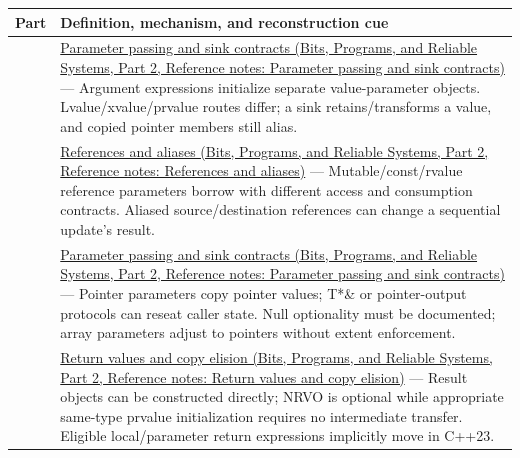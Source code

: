 {\def\LTcaptype{none} %
\begin{longtable}[]{@{}
  >{\raggedright\arraybackslash}p{}
  >{\raggedright\arraybackslash}p{}@{}}
\toprule\noalign{}
\begin{minipage}[b]{\linewidth}\raggedright
Part
\end{minipage} & \begin{minipage}[b]{\linewidth}\raggedright
Definition, mechanism, and reconstruction cue
\end{minipage} \\
\midrule\noalign{}
\endhead
\bottomrule\noalign{}
\endlastfoot
127 & \href{../01-Bits-Programs-and-Reliable-Systems-P02/main.pdf\#nameddest=appendix-d5908f75721f}{Parameter passing and sink contracts (Bits, Programs, and Reliable Systems, Part 2, Reference notes: Parameter passing and sink contracts)} --- Argument expressions initialize separate value-parameter objects. Lvalue/xvalue/prvalue routes differ; a sink retains/transforms a value, and copied pointer members still alias. \\
128 & \href{../01-Bits-Programs-and-Reliable-Systems-P02/main.pdf\#nameddest=appendix-d6d562ca9fbb}{References and aliases (Bits, Programs, and Reliable Systems, Part 2, Reference notes: References and aliases)} --- Mutable/const/rvalue reference parameters borrow with different access and consumption contracts. Aliased source/destination references can change a sequential update's result. \\
129 & \href{../01-Bits-Programs-and-Reliable-Systems-P02/main.pdf\#nameddest=appendix-d5908f75721f}{Parameter passing and sink contracts (Bits, Programs, and Reliable Systems, Part 2, Reference notes: Parameter passing and sink contracts)} --- Pointer parameters copy pointer values; T*\& or pointer-output protocols can reseat caller state. Null optionality must be documented; array parameters adjust to pointers without extent enforcement. \\
130 & \href{../01-Bits-Programs-and-Reliable-Systems-P02/main.pdf\#nameddest=appendix-b08d3788c5c6}{Return values and copy elision (Bits, Programs, and Reliable Systems, Part 2, Reference notes: Return values and copy elision)} --- Result objects can be constructed directly; NRVO is optional while appropriate same-type prvalue initialization requires no intermediate transfer. Eligible local/parameter return expressions implicitly move in C++23. \\

\end{longtable}}
